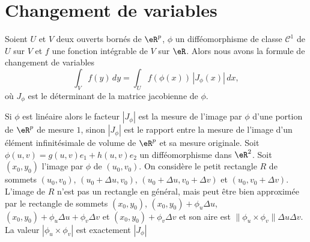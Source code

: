 \section{Changement de variables}
\begin{theorem}		\label{ThoChmVarInt}
  Soient $U$ et $V$ deux ouverts bornés de $\eR^p$, $\phi$ un difféomorphisme de classe $\mathcal{C}^1$ de $U$ sur $V$ et $f$ une fonction intégrable de $V$ sur $\eR$. Alors nous avons la formule de changement de variables 
  \begin{equation}
    \int_{V}f(y)\, dy= \int_{U} f(\phi(x))\, \left| J_{\phi}(x)\right|\, dx,
  \end{equation}
  où $J_{\phi}$ est le déterminant de la matrice jacobienne de $\phi$. 
\end{theorem}
Si $\phi$ est linéaire  alors le facteur $|J_{\phi}|$ est la mesure de l'image par $\phi$ d'une portion de $\eR^p$ de mesure $1$, sinon  $|J_{\phi}|$ est le rapport entre la mesure de l'image d'un élément infinitésimale de volume de $\eR^p$ et sa mesure originale. 
Soit $\phi(u,v)=g(u,v)e_1+h(u,v)e_2$ un difféomorphisme dans $\eR^2$. Soit $(x_0, y_0)$ l'image par $\phi$ de $(u_0,v_0)$. On considère le petit rectangle $R$ de sommets $(u_0,v_0)$, $(u_0+\Delta u,v_0)$, $(u_0+\Delta u,v_0+\Delta v)$ et $(u_0,v_0+\Delta v)$. L'image de $R$ n'est pas un rectangle en général, mais peut être bien approximée par le rectangle de sommets $(x_0,y_0)$, $(x_0 ,y_0)+ \phi_{u}\Delta u$, $(x_0 ,y_0)+\phi_{u}\Delta u +\phi_{v}\Delta v$ et  $(x_0 ,y_0)+ \phi_{v}\Delta v$ et son aire est $\| \phi_{u}\times \phi_{v}\| \Delta u\Delta v$. La valeur $|\phi_{u}\times \phi_{v}|$ est exactement $|J_{\phi}|$ 

